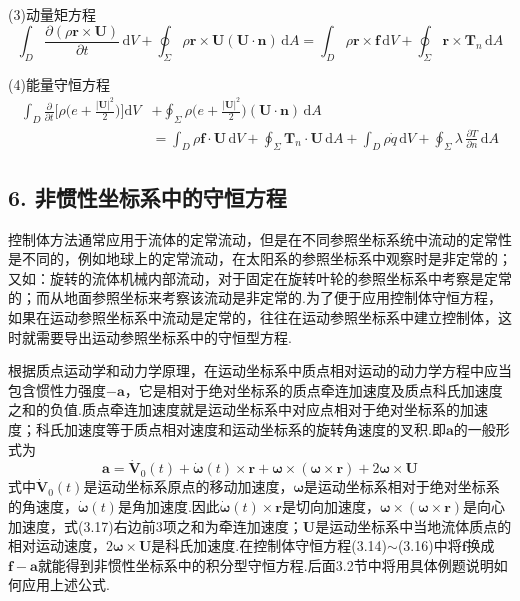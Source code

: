 (3)动量矩方程
\begin{equation*}
\int_D \frac{\partial(\rho\boldsymbol{r}\times\boldsymbol{U})}{\partial t}\,\mathrm{d}V+\oint_\Sigma \rho\boldsymbol{r}\times\boldsymbol{U}(\boldsymbol{U}\cdot\boldsymbol{n})\,\mathrm{d}A=\int_D \rho\boldsymbol{r}\times\boldsymbol{f}\,\mathrm{d}V+\oint_\Sigma \boldsymbol{r}\times\boldsymbol{T}_n\,\mathrm{d}A
\tag{3.15}
\end{equation*}

(4)能量守恒方程
\begin{align*}
\int_D \frac{\partial}{\partial t}\Big[\rho\Big(e+\frac{|\boldsymbol{U}|^{2}}{2}\Big)\Big]\mathrm{d}V&+\oint_\Sigma \rho\Big(e+\frac{|\boldsymbol{U}|^{2}}{2}\Big)(\boldsymbol{U}\cdot\boldsymbol{n})\,\mathrm{d}A\\
&=\int_D \rho\boldsymbol{f}\cdot\boldsymbol{U}\,\mathrm{d}V+\oint_\Sigma \boldsymbol{T}_n\cdot\boldsymbol{U}\,\mathrm{d}A+\int_D \rho\dot{q}\,\mathrm{d}V+\oint_\Sigma \lambda\,\frac{\partial T}{\partial n}\,\mathrm{d}A
\tag{3.16}
\end{align*}

\subsection*{6. 非惯性坐标系中的守恒方程}

控制体方法通常应用于流体的定常流动，但是在不同参照坐标系统中流动的定常性是不同的，例如地球上的定常流动，在太阳系的参照坐标系中观察时是非定常的；又如：旋转的流体机械内部流动，对于固定在旋转叶轮的参照坐标系中考察是定常的；而从地面参照坐标来考察该流动是非定常的.为了便于应用控制体守恒方程，如果在运动参照坐标系中流动是定常的，往往在运动参照坐标系中建立控制体，这时就需要导出运动参照坐标系中的守恒型方程.

根据质点运动学和动力学原理，在运动坐标系中质点相对运动的动力学方程中应当包含惯性力强度$-\boldsymbol{a}$，它是相对于绝对坐标系的质点牵连加速度及质点科氏加速度之和的负值.质点牵连加速度就是运动坐标系中对应点相对于绝对坐标系的加速度；科氏加速度等于质点相对速度和运动坐标系的旋转角速度的叉积.即$\boldsymbol{a}$的一般形式为
\begin{equation*}
\boldsymbol{a}=\dot{\boldsymbol{V}}_0(t)+\dot{\boldsymbol{\omega}}(t)\times\boldsymbol{r}+\boldsymbol{\omega}\times(\boldsymbol{\omega}\times\boldsymbol{r})+2\boldsymbol{\omega}\times\boldsymbol{U}
\tag{3.17}
\end{equation*}
式中$\dot{\boldsymbol{V}}_0(t)$是运动坐标系原点的移动加速度，$\boldsymbol{\omega}$是运动坐标系相对于绝对坐标系的角速度，$\dot{\boldsymbol{\omega}}(t)$是角加速度.因此$\dot{\boldsymbol{\omega}}(t)\times\boldsymbol{r}$是切向加速度，$\boldsymbol{\omega}\times(\boldsymbol{\omega}\times\boldsymbol{r})$是向心加速度，式(3.17)右边前3项之和为牵连加速度；$\boldsymbol{U}$是运动坐标系中当地流体质点的相对运动速度，$2\boldsymbol{\omega}\times\boldsymbol{U}$是科氏加速度.在控制体守恒方程(3.14)$\sim$(3.16)中将$\boldsymbol{f}$换成$\boldsymbol{f}-\boldsymbol{a}$就能得到非惯性坐标系中的积分型守恒方程.后面3.2节中将用具体例题说明如何应用上述公式.

